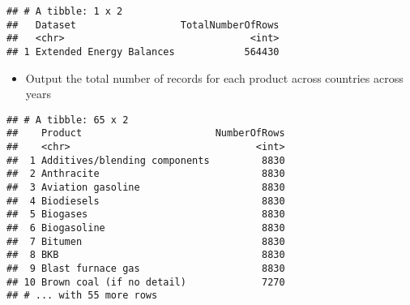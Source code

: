 \documentclass[
]{article}
\newenvironment{Shaded}{\begin{snugshade}}{\end{snugshade}}
\newcommand{\DataTypeTok}[1]{\textcolor[rgb]{0.13,0.29,0.53}{#1}}
\newcommand{\KeywordTok}[1]{\textcolor[rgb]{0.13,0.29,0.53}{\textbf{#1}}}
\newcommand{\NormalTok}[1]{#1}
\newcommand{\OperatorTok}[1]{\textcolor[rgb]{0.81,0.36,0.00}{\textbf{#1}}}
\newcommand{\StringTok}[1]{\textcolor[rgb]{0.31,0.60,0.02}{#1}}
\providecommand{\tightlist}{%
  \setlength{\itemsep}{0pt}\setlength{\parskip}{0pt}}
\begin{document}
\begin{verbatim}
## # A tibble: 1 x 2
##   Dataset                  TotalNumberOfRows
##   <chr>                                <int>
## 1 Extended Energy Balances            564430
\end{verbatim}

\begin{itemize}
\tightlist
\item
  Output the total number of records for each product across countries
  across years
\end{itemize}

\begin{Shaded}
\end{Shaded}

\begin{verbatim}
## # A tibble: 65 x 2
##    Product                       NumberOfRows
##    <chr>                                <int>
##  1 Additives/blending components         8830
##  2 Anthracite                            8830
##  3 Aviation gasoline                     8830
##  4 Biodiesels                            8830
##  5 Biogases                              8830
##  6 Biogasoline                           8830
##  7 Bitumen                               8830
##  8 BKB                                   8830
##  9 Blast furnace gas                     8830
## 10 Brown coal (if no detail)             7270
## # ... with 55 more rows
\end{verbatim}
\end{document}
